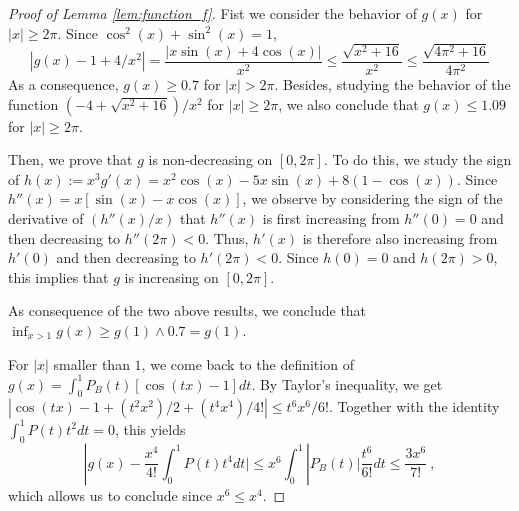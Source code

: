 \documentclass[twoside,11pt]{article}
\newcommand{\<}{\langle}
\renewcommand{\>}{\rangle}
\begin{document}
\begin{proof}[Proof of Lemma \ref{lem:function_f}]
Fist we consider the behavior of $g(x)$ for $|x|\geq 2\pi$. Since $\cos^2(x)+\sin^2(x)=1$, 
\[ |g(x)-1 + 4/x^2|= \frac{|x\sin(x)+ 4\cos(x)|}{x^2}\leq \frac{\sqrt{x^2+16}}{x^2}\leq \frac{\sqrt{4\pi^2+16}}{4\pi^2}\]
 As a consequence, $g(x)\geq 0.7$ for $|x|>2\pi$. Besides, studying the behavior of the function $(-4+\sqrt{x^2+16})/x^2$ for $|x|\geq 2\pi$, we also conclude that $g(x)\leq 1.09$ for $|x|\geq 2\pi$.
 
 Then, we prove that $g$ is non-decreasing on $[0,2\pi]$. To do this, we study the sign of $h(x):= x^3g'(x)=x^2\cos(x)-5x\sin(x)+ 8(1-\cos(x))$. Since $h''(x)= x[\sin(x)-x\cos(x)]$, we observe by considering the sign of the derivative of $(h''(x)/x)$ that $h''(x)$ is first increasing from $h''(0)=0$ and then decreasing to $h''(2\pi)<0$. Thus, $h'(x)$ is therefore also increasing from $h'(0)$ and then decreasing to $h'(2\pi)<0$. Since $h(0)=0$ and $h(2\pi)>0$, this implies that $g$ is increasing on $[0,2\pi]$.
 
 
 As consequence of the two above results, we conclude that $\inf_{x>1} g(x)\geq g(1)\wedge 0.7=g(1)$.
 
 \medskip
 

 For $|x|$ smaller than $1$, we come back to the definition of $g(x)=\int_0^1 P_B(t)[\cos(tx)-1]dt$. By Taylor's inequality, we get $|\cos(tx)-1+(t^2x^2)/2 + (t^4x^4)/4!|\leq t^6x^6/6!$. Together with the identity $\int_0^1 P(t)t^2dt=0$, this yields 
 \[
  |g(x) - \frac{x^4}{4!}\int_0^1P(t)t^4dt\big|\leq x^6 \int_0^1|P_B(t)| \frac{t^6}{6!}dt \leq \frac{3x^6}{7!}\ , 
 \]
which allows us to conclude since $x^6\leq x^4$.

 
 
\end{proof}
\end{document}
